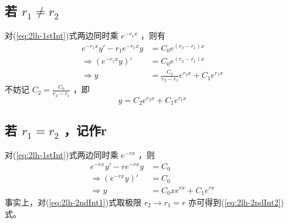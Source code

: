 \documentclass[UTF8]{ctexart}
\newcommand\mathe{\mathit{e}}
\begin{document}
	\subsection{若 $r_{1}\neq r_{2}$ } 
		对(\ref{eq:2lh-1stInt})式两边同时乘 $\mathe^{-r_{1}x}$ ，则有
		\begin{align}
			\mathe^{-r_{1}x}y'-r_{1}\mathe^{-r_{1}x}y&=C_{0}\mathe^{(r_{2}-r_{1})x} \\
			\Rightarrow (\mathe^{-r_{1}x}y)'&=C_{0}\mathe^{(r_{2}-r_{1})x} \\
			\Rightarrow y&=\frac{C_{0}}{r_{2}-r_{1}}\mathe^{r_{2}x}+C_{1}\mathe^{r_{1}x} \label{eq:2lh-2ndInt1}
		\end{align}
		不妨记 $C_{2}=\frac{C_{0}}{r_{2}-r_{1}}$ ，即
		\begin{equation}
			y=C_{2}\mathe^{r_{2}x}+C_{1}\mathe^{r_{1}x} \label{eq:2lh-result1}
		\end{equation}
	\subsection{若 $r_{1}=r_{2}$ ，记作r}
		对(\ref{eq:2lh-1stInt})式两边同时乘 $\mathe^{-rx}$ ，则
		\begin{align}
			\mathe^{-rx}y'-r\mathe^{-rx}y&=C_{0} \\
			\Rightarrow (\mathe^{-rx}y)'&=C_{0} \\
			\Rightarrow y&=C_{0}x\mathe^{rx}+C_{1}\mathe^{rx} \label{eq:2lh-2ndInt2}
		\end{align}
		事实上，对(\ref{eq:2lh-2ndInt1})式取极限 $r_{2}\rightarrow r_{1}=r$ 亦可得到(\ref{eq:2lh-2ndInt2})式。
\end{document}

